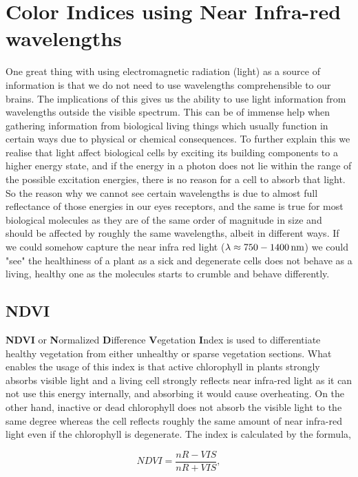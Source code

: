 \section{Color Indices using Near Infra-red wavelengths}

One great thing with using electromagnetic radiation (light) as a source of information is that we do not need to use wavelengths comprehensible to our brains. The implications of this gives us the ability to use light information from wavelengths outside the visible spectrum. This can be of immense help when gathering information from biological living things which usually function in certain ways due to physical or chemical consequences. To further explain this we realise that light affect biological cells by exciting its building components to a higher energy state, and if the energy in a photon does not lie within the range of the possible excitation energies, there is no reason for a cell to absorb that light. So the reason why we cannot see certain wavelengths is due to almost full reflectance of those energies in our eyes receptors, and the same is true for most biological molecules as they are of the same order of magnitude in size and should be affected by roughly the same wavelengths, albeit in different ways. If we could somehow capture the near infra red light ($\lambda \approx \unit[750-1400]{nm}$) we could "see" the healthiness of a plant as a sick and degenerate cells does not behave as a living, healthy one as the molecules starts to crumble and behave differently.

\subsection{NDVI}

\textbf{NDVI} or \textbf{N}ormalized \textbf{D}ifference \textbf{V}egetation \textbf{I}ndex is used to differentiate healthy vegetation from either unhealthy or sparse vegetation  sections\cite{ndviSource}. What enables the usage of this index is that active chlorophyll in plants strongly absorbs visible light and a living cell strongly reflects near infra-red light as it can not use this energy internally, and absorbing it would cause overheating. On the other hand, inactive or dead chlorophyll does not absorb the visible light to the same degree whereas the cell reflects roughly the same amount of near infra-red light even if the chlorophyll is degenerate. The index is calculated by the formula,

\begin{equation}
	\label{eq:ndvi}
	NDVI = \frac{nR-VIS}{nR+VIS},
\end{equation}


